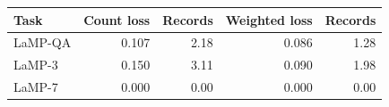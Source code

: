 \begin{center}\small\begin{tabular}{lrrrr}\toprule
Task & Count loss & Records & Weighted loss & Records \\ \midrule
LaMP-QA & 0.107 & 2.18 & 0.086 & 1.28 \\
LaMP-3 & 0.150 & 3.11 & 0.090 & 1.98 \\
LaMP-7 & 0.000 & 0.00 & 0.000 & 0.00 \\
\bottomrule\end{tabular}\end{center}
